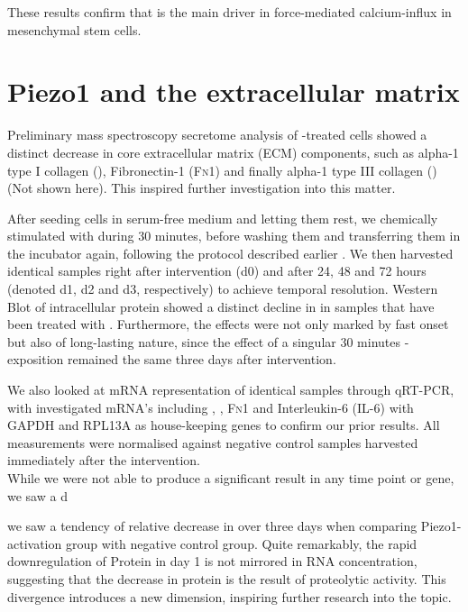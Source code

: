These results confirm that \Piezo{} is the main driver in force-mediated calcium-influx in mesenchymal stem cells.


\section{Piezo1 and the extracellular matrix}

Preliminary mass spectroscopy secretome analysis of \Yoda-treated cells showed a distinct decrease in core extracellular matrix (ECM) components, such as alpha-1 type I collagen (\colone), Fibronectin-1 (\textsc{Fn1}) and finally alpha-1 type III collagen (\colthree) (Not shown here).
This inspired further investigation into this matter.\par

After seeding cells in serum-free medium and letting them rest, we chemically stimulated \Piezo{} with \Yoda{} during 30 minutes, before washing them and transferring them in the incubator again, following the protocol described earlier . We then harvested identical samples right after intervention (d0) and after 24, 48 and 72 hours (denoted d1, d2 and d3, respectively) to achieve temporal resolution. Western Blot of intracellular protein showed a distinct decline in \colone in samples that have been treated with \Yoda{}.  Furthermore, the effects were not only marked by fast onset but also of long-lasting nature, since the effect of a singular 30 minutes \Yoda{}-exposition remained the same three days after intervention.\par
We also looked at mRNA representation of identical samples through qRT-PCR, with investigated mRNA's including \colone{}, \colthree{}, \textsc{Fn}1 and Interleukin-6 (IL-6) with GAPDH and RPL13A as house-keeping genes to confirm our prior results.  All measurements were normalised against negative control samples harvested immediately after the intervention.\\
While we were not able to produce a significant result in any time point or gene, we saw a d


we saw a tendency of relative decrease in \colone{} over three days when comparing Piezo1-activation group with negative control group. Quite remarkably, the rapid downregulation of Protein in day 1 is not mirrored in RNA concentration, suggesting that the decrease in protein is the result of proteolytic activity. This divergence introduces a new dimension, inspiring further research into the topic.

